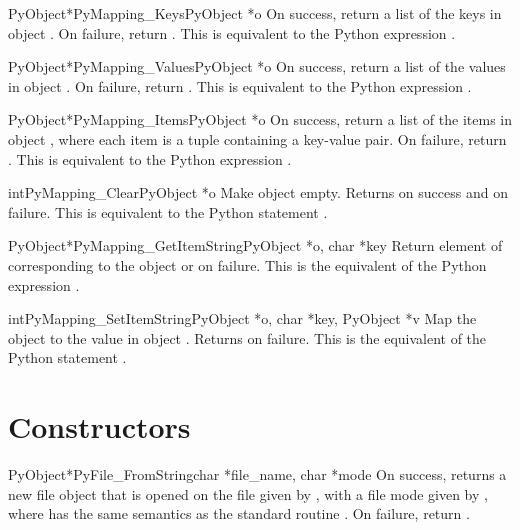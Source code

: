 \documentclass{manual}
\begin{document}
\begin{cfuncdesc}{PyObject*}{PyMapping_Keys}{PyObject *o}
On success, return a list of the keys in object .  On
failure, return \NULL{}. This is equivalent to the Python
expression .
\end{cfuncdesc}


\begin{cfuncdesc}{PyObject*}{PyMapping_Values}{PyObject *o}
On success, return a list of the values in object .  On
failure, return \NULL{}. This is equivalent to the Python
expression .
\end{cfuncdesc}


\begin{cfuncdesc}{PyObject*}{PyMapping_Items}{PyObject *o}
On success, return a list of the items in object , where
each item is a tuple containing a key-value pair.  On
failure, return \NULL{}. This is equivalent to the Python
expression .
\end{cfuncdesc}

\begin{cfuncdesc}{int}{PyMapping_Clear}{PyObject *o}
Make object  empty.  Returns  on success and 
on failure.  This is equivalent to the Python statement
.
\end{cfuncdesc}


\begin{cfuncdesc}{PyObject*}{PyMapping_GetItemString}{PyObject *o, char *key}
Return element of  corresponding to the object  or
\NULL{} on failure. This is the equivalent of the Python expression
.
\end{cfuncdesc}

\begin{cfuncdesc}{int}{PyMapping_SetItemString}{PyObject *o, char *key, PyObject *v}
Map the object  to the value  in object .
Returns  on failure.  This is the equivalent of the Python
statement .
\end{cfuncdesc}


\section{Constructors}

\begin{cfuncdesc}{PyObject*}{PyFile_FromString}{char *file_name, char *mode}
On success, returns a new file object that is opened on the
file given by , with a file mode given by ,
where  has the same semantics as the standard \C{} routine
.  On failure, return .
\end{cfuncdesc}
\end{document}
